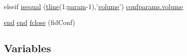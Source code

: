\begin{DoxyCompactItemize}
$$\item 
elseif \hyperlink{a00028_ab95e741dbc04dc8030ed60d7b15454a1}{isequal} (\hyperlink{a00033_a6791897869706b835f1a5d305739a415}{tline}(1\-:\hyperlink{a00033_a51f20d6b1b54a2eee3be0e8adc96a0ae}{param}-\/1),'\hyperlink{a00113_a9bc498ccac8db41438f855f5dd3f4c05}{volume}') \hyperlink{a00113_a9bc498ccac8db41438f855f5dd3f4c05}{confparams.\-volume}
\item 
\hyperlink{a00025_afb358f48b1646c750fb9da6c6585be2b}{end} \hyperlink{a00025_afb358f48b1646c750fb9da6c6585be2b}{end} \hyperlink{a00028_a66a54a4db5a27a03991b5f3034bbc6a4}{fclose} (fid\-Conf)
\end{DoxyCompactItemize}
\subsection*{Variables}
